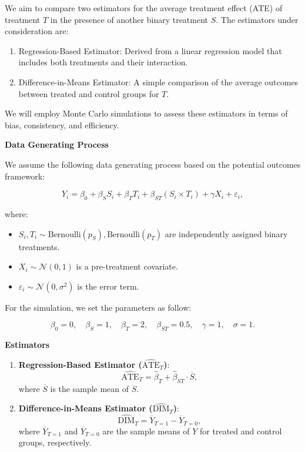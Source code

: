 \documentclass{article}
\begin{document}
We aim to compare two estimators for the average treatment effect (ATE) of treatment \( T \) in the presence of another binary treatment \( S \). The estimators under consideration are:

\begin{enumerate}
    \item Regression-Based Estimator: Derived from a linear regression model that includes both treatments and their interaction.
    \item Difference-in-Means Estimator: A simple comparison of the average outcomes between treated and control groups for \( T \).
\end{enumerate}

We will employ Monte Carlo simulations to assess these estimators in terms of bias, consistency, and efficiency.

\textbf{Data Generating Process}

We assume the following data generating process based on the potential outcomes framework:

\[
Y_i = \beta_0 + \beta_S S_i + \beta_T T_i + \beta_{ST} (S_i \times T_i) + \gamma X_i + \varepsilon_i,
\]

where:
\begin{itemize}
    \item \( S_i, T_i \sim \text{Bernoulli}(p_S), \text{Bernoulli}(p_T) \) are independently assigned binary treatments.
    \item \( X_i \sim \mathcal{N}(0,1) \) is a pre-treatment covariate.
    \item \( \varepsilon_i \sim \mathcal{N}(0, \sigma^2) \) is the error term.
\end{itemize}

For the simulation, we set the parameters as follow:

\[
\beta_0 = 0,\quad \beta_S = 1,\quad \beta_T = 2,\quad \beta_{ST} = 0.5,\quad \gamma = 1,\quad \sigma = 1.
\]

\newpage 
\textbf{Estimators}

\begin{enumerate}
    \item \textbf{Regression-Based Estimator (\( \hat{\text{ATE}}_T \))}:
    \[
    \hat{\text{ATE}}_T = \hat{\beta}_T + \hat{\beta}_{ST} \cdot \overline{S},
    \]
    where \( \overline{S} \) is the sample mean of \( S \).

    \item \textbf{Difference-in-Means Estimator (\( \hat{\text{DIM}}_T \))}:
    \[
    \hat{\text{DIM}}_T = \overline{Y}_{T=1} - \overline{Y}_{T=0},
    \]
    where \( \overline{Y}_{T=1} \) and \( \overline{Y}_{T=0} \) are the sample means of \( Y \) for treated and control groups, respectively.
\end{enumerate}
\end{document}
